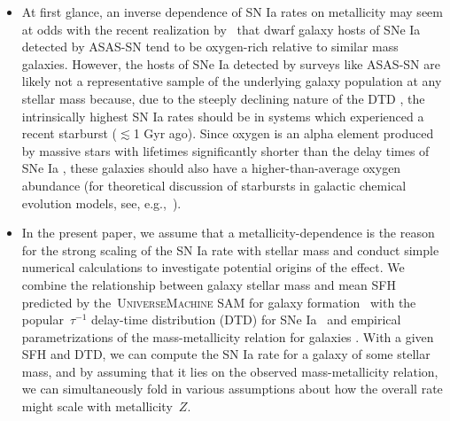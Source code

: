 \documentclass[ms.tex]{subfiles}
\begin{document}
\begin{itemize}
	\item At first glance, an inverse dependence of SN Ia rates on metallicity
	may seem at odds with the recent realization by~\citet{Holoien2022} that
	dwarf galaxy hosts of SNe Ia detected by ASAS-SN tend to be oxygen-rich
	relative to similar mass galaxies.
	However, the hosts of SNe Ia detected by surveys like ASAS-SN are likely
	not a representative sample of the underlying galaxy population at any
	stellar mass because, due to the steeply declining nature of the DTD
	\citep[e.g.][]{Maoz2012}, the intrinsically highest SN Ia rates should
	be in systems which experienced a recent starburst ($\lesssim$1 Gyr ago).
	Since oxygen is an alpha element produced by massive stars with lifetimes
	significantly shorter than the delay times of SNe Ia
	\citep*[e.g.][]{Hurley2000, Johnson2019}, these galaxies should also have
	a higher-than-average oxygen abundance (for theoretical discussion of
	starbursts in galactic chemical evolution models, see,
	e.g.,~\citealt{Johnson2020}).

	\item In the present paper, we assume that a metallicity-dependence is the
	reason for the strong scaling of the SN Ia rate with stellar mass and
	conduct simple numerical calculations to investigate potential origins of
	the effect.
	We combine the relationship between galaxy stellar mass and mean SFH
	predicted by the~\textsc{UniverseMachine} SAM for galaxy
	formation~\citep{Behroozi2019} with the popular~$\tau^{-1}$ delay-time
	distribution (DTD) for SNe Ia~\citep[e.g.][]{Maoz2012a} and empirical
	parametrizations of the mass-metallicity relation for galaxies
	\citep{Andrews2013, Zahid2014}.
	With a given SFH and DTD, we can compute the SN Ia rate for a galaxy of
	some stellar mass, and by assuming that it lies on the observed
	mass-metallicity relation, we can simultaneously fold in various
	assumptions about how the overall rate might scale with metallicity~$Z$.

\end{itemize}
\end{document}
